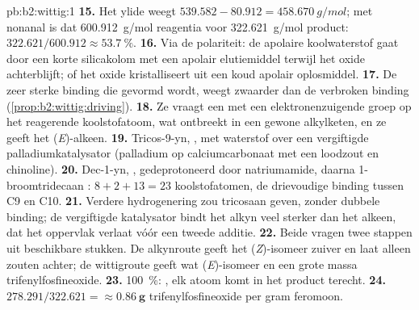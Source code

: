 \begin{solution}{pb:b2:wittig:1}
\textbf{15.} Het ylide  weegt $539.582 - 80.912 = \qty{458.670}{g/mol}$; met nonanal is dat
\qty{600.912}{g/mol} reagentia voor \qty{322.621}{g/mol} product: $322.621/600.912 \approx
53.7~\%$.
\textbf{16.} Via de polariteit: de apolaire koolwaterstof gaat door een korte silicakolom met een
apolair elutiemiddel terwijl het oxide achterblijft; of het oxide kristalliseert uit een koud apolair oplosmiddel.
\textbf{17.} De zeer sterke binding  die gevormd wordt, weegt zwaarder dan de verbroken binding 
(\cref{prop:b2:wittig:driving}).
\textbf{18.} Ze vraagt een  met een elektronenzuigende groep op het reagerende koolstofatoom, wat ontbreekt
in een gewone alkylketen, en ze geeft het (\textit{E})-alkeen.
\textbf{19.} Tricos-9-yn, , met waterstof over een vergiftigde
palladiumkatalysator (palladium op calciumcarbonaat met een loodzout en chinoline).
\textbf{20.} Dec-1-yn, , gedeprotoneerd door natriumamide, daarna 1-broomtridecaan
: $8 + 2 + 13 = 23$ koolstofatomen, de drievoudige binding tussen C9 en C10.
\textbf{21.} Verdere hydrogenering zou tricosaan geven, zonder dubbele binding; de vergiftigde katalysator
bindt het alkyn veel sterker dan het alkeen, dat het oppervlak verlaat vóór een tweede additie.
\textbf{22.} Beide vragen twee stappen uit beschikbare stukken. De alkynroute geeft het (\textit{Z})-isomeer
zuiver en laat alleen zouten achter; de wittigroute geeft wat (\textit{E})-isomeer en een grote massa
trifenylfosfineoxide.
\textbf{23.} 100~\%: , elk atoom komt in het product terecht.
\textbf{24.} $278.291/322.621 = \boldsymbol{\approx \qty{0.86}{g}}$ trifenylfosfineoxide per
gram feromoon.
\end{solution}
